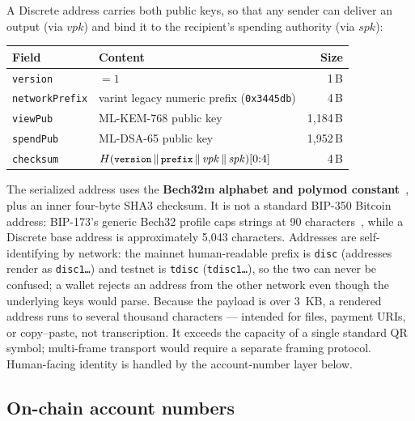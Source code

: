 \documentclass[11pt,a4paper]{article}
\newcommand{\code}[1]{\texttt{\small #1}}
\newcommand{\concat}{\,\|\,}
\begin{document}
A Discrete address carries both public keys, so that any sender can deliver
an output (via $\mathit{vpk}$) and bind it to the recipient's spending
authority (via $\mathit{spk}$):

\begin{center}
\small
\begin{tabular}{@{}llr@{}}
\toprule
\textbf{Field} & \textbf{Content} & \textbf{Size} \\
\midrule
\code{version}       & $= 1$                                & 1\,B \\
\code{networkPrefix} & varint legacy numeric prefix (\code{0x3445db}) & 4\,B \\
\code{viewPub}       & ML-KEM-768 public key                 & 1{,}184\,B \\
\code{spendPub}      & ML-DSA-65 public key                  & 1{,}952\,B \\
\code{checksum}      & $H(\text{\code{version}} \concat \text{\code{prefix}}
                        \concat \mathit{vpk} \concat \mathit{spk})[0{:}4]$ & 4\,B \\
\bottomrule
\end{tabular}
\end{center}

The serialized address uses the \textbf{Bech32m alphabet and polymod
constant}~\cite{bip350}, plus an inner four-byte SHA3 checksum. It is not a
standard BIP-350 Bitcoin address: BIP-173's generic Bech32 profile caps strings
at 90 characters~\cite{bip173}, while a Discrete base address is approximately
5{,}043 characters. Addresses
are self-identifying by network: the mainnet human-readable prefix is
\code{disc} (addresses render as \code{disc1\ldots}) and testnet is
\code{tdisc} (\code{tdisc1\ldots}), so the two can never be confused; a
wallet rejects an address from the other network even though the underlying
keys would parse. Because the payload is over 3~KB, a rendered address runs to
several thousand characters --- intended for files, payment URIs, or
copy--paste, not transcription. It exceeds the capacity of a single standard
QR symbol; multi-frame transport would require a separate framing protocol.
Human-facing identity is
handled by the account-number layer below.

\subsection{On-chain account numbers}\label{sec:accounts}
\end{document}
